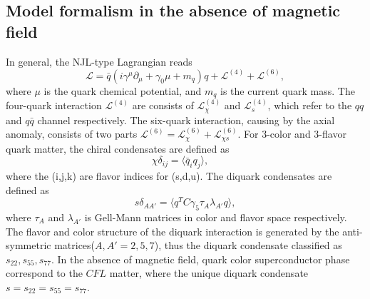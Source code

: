\documentclass[prd, showpacs,nofootinbib,amsmath,amssymb,12pt]{revtex4}
\begin{document}
\subsection{Model formalism in the absence of magnetic  field}
\label{sec:2a}
In general, the NJL-type Lagrangian\cite{abuki2010nambu} reads
\begin{equation}
	\mathcal{L} = \bar{q} (i\gamma^\mu \partial_\mu + \gamma_0\mu +m_q) q +
	\mathcal{L}^{(4)}+ \mathcal{L}^{(6)},
	\label{eq:lag}
\end{equation}
where $\mu$ is the quark chemical potential, and $m_q$ is the current quark mass.
The four-quark interaction $\mathcal{L}^{(4)}$ are consists of $\mathcal{L}^{(4)}_\chi$ and $\mathcal{L}^{(4)}_s$, 
which refer to the $qq$ and $q\bar{q}$ channel respectively.
The six-quark interaction, causing by the axial anomaly, 
consists of two parts $\mathcal{L}^{(6)}=\mathcal{L}^{(6)}_{\chi}+\mathcal{L}^{(6)}_{\chi s}$. 
For 3-color and 3-flavor quark matter, the chiral condensates are defined as 
\begin{equation}
\chi\delta_{ij}= \langle\bar{q}_i q_j\rangle,\quad
\end{equation}
where the (i,j,k) are flavor indices for (s,d,u).
The diquark condensates are defined as 
\begin{equation}
s\delta_{AA'}=\langle q^TC\gamma_5\tau_A\lambda_{A'} q\rangle,
\end{equation}
where $\tau_A$ and $\lambda_{A'}$ is Gell-Mann matrices in color and flavor space respectively.
The flavor and color structure of the diquark interaction is generated by the anti-symmetric matrices($A,A'=2,5,7$), 
thus the diquark condensate classified as $s_{22}, s_{55}, s_{77}$.
In the absence of magnetic field, quark color superconductor phase correspond to the $CFL$ matter, 
where the unique diquark condensate $s=s_{22}=s_{55}=s_{77}$.
\end{document}
